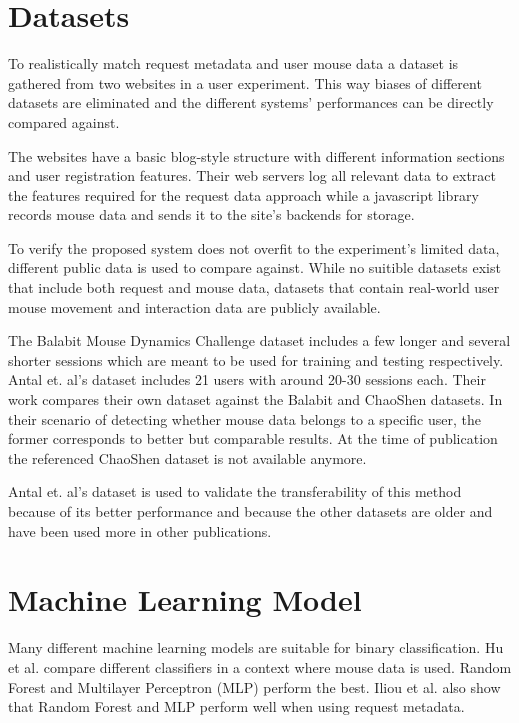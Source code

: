 \documentclass[
    fontsize=12pt,
    headings=small,
    parskip=half,           %
    bibliography=totoc,
    numbers=noenddot,       %
    open=any,               %
    final                   %
]{scrreprt}
\begin{document}
\section{Datasets}

To realistically match request metadata and user mouse data a dataset is gathered from two websites in a user experiment. This way biases of different datasets are eliminated and the different systems' performances can be directly compared against.

The websites have a basic blog-style structure with different information sections and user registration features. Their web servers log all relevant data to extract the features required for the request data approach while a javascript library records mouse data and sends it to the site's backends for storage.

To verify the proposed system does not overfit to the experiment's limited data, different public data is used to compare against. While no suitible datasets exist that include both request and mouse data, datasets that contain real-world user mouse movement and interaction data are publicly available.

The Balabit Mouse Dynamics Challenge dataset \cite{BALABIT_CHALLENGE} includes a few longer and several shorter sessions which are meant to be used for training and testing respectively.
Antal et. al's dataset \cite{9111596} includes 21 users with around 20-30 sessions each. Their work compares their own dataset against the Balabit and ChaoShen datasets. In their scenario of detecting whether mouse data belongs to a specific user, the former corresponds to better but comparable results.
At the time of publication the referenced ChaoShen dataset is not available anymore.

Antal et. al's dataset is used to validate the transferability of this method because of its better performance and because the other datasets are older and have been used more in other publications.


\section{Machine Learning Model}

Many different machine learning models are suitable for binary classification. Hu et al. \cite{8275816} compare different classifiers in a context where mouse data is used. Random Forest and Multilayer Perceptron (MLP) perform the best.
Iliou et al. \cite{10.1145/3339252.3339267} also show that Random Forest and MLP perform well when using request metadata.
\end{document}

